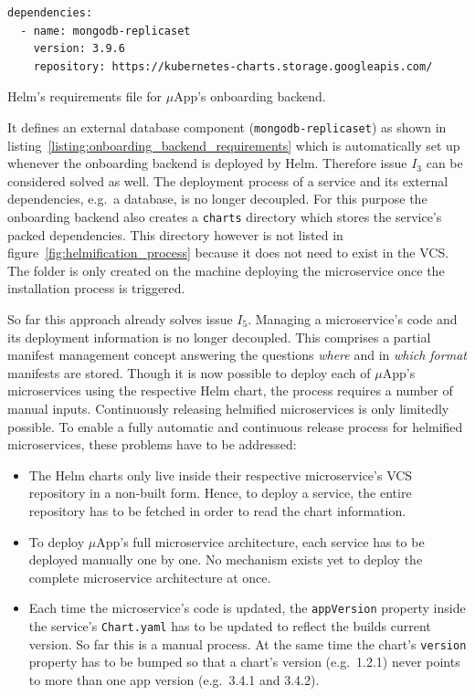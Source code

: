 \begin{listing}[H]
  \begin{verbatim}
dependencies:
  - name: mongodb-replicaset
    version: 3.9.6
    repository: https://kubernetes-charts.storage.googleapis.com/
  \end{verbatim}
  \caption{Helm's requirements file for $\mu$App's onboarding backend.}%
  \label{listing:onboarding_backend_requirements}
\end{listing}

It defines an external database component (\texttt{mongodb-replicaset}) as
shown in listing~\ref{listing:onboarding_backend_requirements} which is
automatically set up whenever the onboarding backend is deployed by Helm.
Therefore issue $I_3$ can be considered solved as well. The deployment process
of a service and its external dependencies, e.g.\ a database, is no longer
decoupled.  For this purpose the onboarding backend also creates a
\texttt{charts} directory which stores the service's packed dependencies. This
directory however is not listed in figure~\ref{fig:helmification_process}
because it does not need to exist in the \ac{VCS}. The folder is only created
on the machine deploying the microservice once the installation process is
triggered.

So far this approach already solves issue $I_5$. Managing a microservice's code
and its deployment information is no longer decoupled. This comprises a partial
manifest management concept answering the questions \textit{where} and in
\textit{which format} manifests are stored. Though it is now possible to deploy
each of $\mu$App's microservices using the respective Helm chart, the process
requires a number of manual inputs. Continuously releasing helmified
microservices is only limitedly possible. To enable a fully automatic and
continuous release process for helmified microservices, these problems have to
be addressed:

\begin{itemize}
  \item The Helm charts only live inside their respective microservice's
    \ac{VCS} repository in a non-built form. Hence, to deploy a service, the
    entire repository has to be fetched in order to read the chart information.
  \item To deploy $\mu$App's full microservice architecture, each service has
    to be deployed manually one by one. No mechanism exists yet to deploy the
    complete microservice architecture at once.
  \item Each time the microservice's code is updated, the \texttt{appVersion}
    property inside the service's \texttt{Chart.yaml} has to be updated to
    reflect the builds current version. So far this is a manual process. At the
    same time the chart's \texttt{version} property has to be bumped so that a
    chart's version (e.g.\ 1.2.1) never points to more than one app version
    (e.g.\ 3.4.1 and 3.4.2).
\end{itemize}

